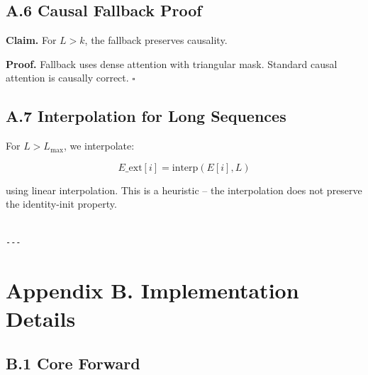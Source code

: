 \subsection{A.6 Causal Fallback Proof}

\textbf{Claim.} For $L > k$, the fallback preserves causality.

\textbf{Proof.} Fallback uses dense attention with triangular mask. Standard 
causal attention is causally correct. $\square$

\subsection{A.7 Interpolation for Long Sequences}

For $L > L_\text{max}$, we interpolate:

\[
E\_\text{ext}[i] = \text{interp}(E[i], L)
\tag{A.7}
\]

using linear interpolation. This is a heuristic -- the interpolation does 
not preserve the identity-init property.
\begin{lstlisting}

---
\end{lstlisting}

\section{Appendix B. Implementation Details}

\subsection{B.1 Core Forward}

